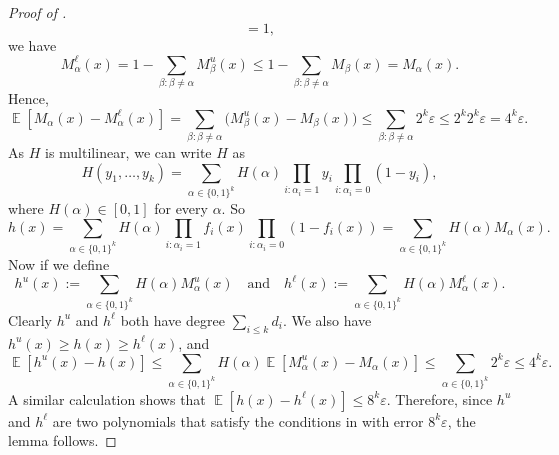 \documentclass{toc}
\newcommand{\zo}{\{0,1\}}
\def\eps{\varepsilon}
\DeclareMathOperator*{\E}{\mathbb{E}}                 %
\begin{document}
\begin{proof}[Proof of {}]
\[      = 1 ,
    \]
    we have 
    \[
      M_\alpha^{\ell}(x) = 1 - \sum_{\beta: \beta \neq \alpha} M_\beta^{u}(x)
      \le 1 - \sum_{\beta: \beta \neq \alpha} M_\beta(x)
      = M_\alpha(x) .
    \]
    Hence,
    \[
      \E[M_\alpha(x) - M_\alpha^\ell(x)]
      = \sum_{\beta: \beta \neq \alpha} \bigl( M_\beta^u(x) - M_\beta(x) \bigr)
      \le \sum_{\beta: \beta \neq \alpha} 2^k \eps
      \le 2^k 2^k \eps
      = 4^k \eps .
    \]
    As $H$ is multilinear, we can write $H$ as
    \[
      H(y_1, \ldots, y_k)
      = \sum_{\alpha \in \zo^k} H(\alpha) \prod_{i: \alpha_i = 1} y_i \prod_{i: \alpha_i = 0} (1 - y_i) ,
    \]
    where $H(\alpha) \in [0,1]$ for every $\alpha$.
    So
    \[
      h(x)
      = \sum_{\alpha \in \zo^k} H(\alpha) \prod_{i:\alpha_i = 1} f_i(x) \prod_{i: \alpha_i = 0} (1 - f_i(x))
      = \sum_{\alpha \in \zo^k} H(\alpha) M_\alpha(x) .
    \]
    Now if we define 
    \[
      h^u(x) := \sum_{\alpha \in \zo^k} H(\alpha) M_\alpha^u(x)
    \quad\text{and}\quad
      h^\ell(x) := \sum_{\alpha \in \zo^k} H(\alpha) M_\alpha^\ell(x) .
    \]
    Clearly $h^u$ and $h^\ell$ both have degree $\sum_{i\le k} d_i$.
    We also have $h^u(x) \ge h(x) \ge h^\ell(x)$, and 
    \[
      \E[h^u(x) - h(x)]
      \le \sum_{\alpha \in \zo^k} H(\alpha) \E[M_\alpha^u(x) - M_\alpha(x)]
      \le \sum_{\alpha \in \zo^k} 2^k \eps
      \le 4^k \eps.
    \]
    A similar calculation shows that $\E[h(x) - h^\ell(x)] \le 8^k \eps$.
    Therefore, since $h^u$ and $h^\ell$ are two polynomials that satisfy the conditions in  with error $8^k \eps$, the lemma follows.
  \end{proof}
  
\end{document}
